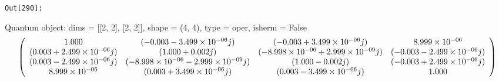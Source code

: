 \documentclass[11pt]{article}
\begin{document}
\texttt{\color{outcolor}Out[{\color{outcolor}290}]:}
    
    Quantum object: dims = [[2, 2], [2, 2]], shape = (4, 4), type = oper, isherm = False\begin{equation*}\left(\begin{array}{*{11}c}1.000 & (-0.003-3.499\times10^{-06}j) & (-0.003+3.499\times10^{-06}j) & 8.999\times10^{-06}\\(0.003+2.499\times10^{-06}j) & (1.000+0.002j) & (-8.998\times10^{-06}+2.999\times10^{-09}j) & (-0.003-2.499\times10^{-06}j)\\(0.003-2.499\times10^{-06}j) & (-8.998\times10^{-06}-2.999\times10^{-09}j) & (1.000-0.002j) & (-0.003+2.499\times10^{-06}j)\\8.999\times10^{-06} & (0.003+3.499\times10^{-06}j) & (0.003-3.499\times10^{-06}j) & 1.000\\\end{array}\right)\end{equation*}

    
\end{document}

